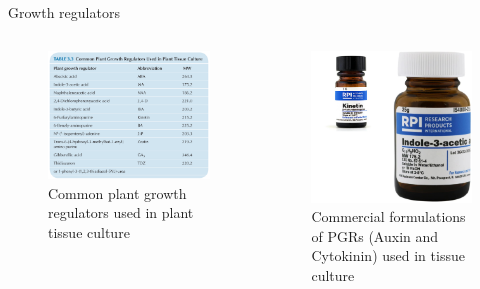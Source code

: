 \documentclass[
  ignorenonframetext,
  aspectratio=169]{beamer}
\begin{document}
\begin{frame}{Growth regulators}
\protect\hypertarget{growth-regulators}{}
\begin{columns}[T,onlytextwidth]

\begin{figure}
\includegraphics[width=0.9\linewidth]{../images/pgr_tissue_culture} \caption{Common plant growth regulators used in plant tissue culture}\label{fig:pgr}
\end{figure}


\begin{figure}
\includegraphics[width=0.6\linewidth]{../images/auxin-cytokinin} \caption{Commercial formulations of PGRs (Auxin and Cytokinin) used in tissue culture}\label{fig:auxin-cytokinin}
\end{figure}

\end{columns}
\end{frame}
\end{document}
